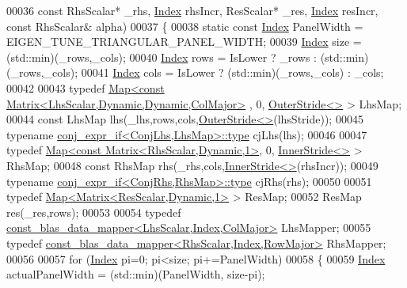 \begin{DoxyCode}
00036         \textcolor{keyword}{const} RhsScalar* \_rhs, \hyperlink{namespace_eigen_a62e77e0933482dafde8fe197d9a2cfde}{Index} rhsIncr, ResScalar* \_res, \hyperlink{namespace_eigen_a62e77e0933482dafde8fe197d9a2cfde}{Index} resIncr, \textcolor{keyword}{const} RhsScalar& 
      alpha)
00037   \{
00038     \textcolor{keyword}{static} \textcolor{keyword}{const} \hyperlink{namespace_eigen_a62e77e0933482dafde8fe197d9a2cfde}{Index} PanelWidth = EIGEN\_TUNE\_TRIANGULAR\_PANEL\_WIDTH;
00039     \hyperlink{namespace_eigen_a62e77e0933482dafde8fe197d9a2cfde}{Index} size = (std::min)(\_rows,\_cols);
00040     \hyperlink{namespace_eigen_a62e77e0933482dafde8fe197d9a2cfde}{Index} rows = IsLower ? \_rows : (std::min)(\_rows,\_cols);
00041     \hyperlink{namespace_eigen_a62e77e0933482dafde8fe197d9a2cfde}{Index} cols = IsLower ? (std::min)(\_rows,\_cols) : \_cols;
00042 
00043     \textcolor{keyword}{typedef} \hyperlink{group___core___module_class_eigen_1_1_map}{Map<const Matrix<LhsScalar,Dynamic,Dynamic,ColMajor>}
      , 0, \hyperlink{class_eigen_1_1_outer_stride}{OuterStride<>} > LhsMap;
00044     \textcolor{keyword}{const} LhsMap lhs(\_lhs,rows,cols,\hyperlink{class_eigen_1_1_outer_stride}{OuterStride<>}(lhsStride));
00045     \textcolor{keyword}{typename} \hyperlink{group___sparse_core___module}{conj\_expr\_if<ConjLhs,LhsMap>::type} cjLhs(lhs);
00046 
00047     \textcolor{keyword}{typedef} \hyperlink{group___core___module_class_eigen_1_1_map}{Map<const Matrix<RhsScalar,Dynamic,1>}, 0, 
      \hyperlink{class_eigen_1_1_inner_stride}{InnerStride<>} > RhsMap;
00048     \textcolor{keyword}{const} RhsMap rhs(\_rhs,cols,\hyperlink{class_eigen_1_1_inner_stride}{InnerStride<>}(rhsIncr));
00049     \textcolor{keyword}{typename} \hyperlink{group___sparse_core___module}{conj\_expr\_if<ConjRhs,RhsMap>::type} cjRhs(rhs);
00050 
00051     \textcolor{keyword}{typedef} \hyperlink{group___core___module_class_eigen_1_1_map}{Map<Matrix<ResScalar,Dynamic,1>} > ResMap;
00052     ResMap res(\_res,rows);
00053 
00054     \textcolor{keyword}{typedef} \hyperlink{class_eigen_1_1internal_1_1const__blas__data__mapper}{const\_blas\_data\_mapper<LhsScalar,Index,ColMajor>}
       LhsMapper;
00055     \textcolor{keyword}{typedef} \hyperlink{class_eigen_1_1internal_1_1const__blas__data__mapper}{const\_blas\_data\_mapper<RhsScalar,Index,RowMajor>}
       RhsMapper;
00056 
00057     \textcolor{keywordflow}{for} (\hyperlink{namespace_eigen_a62e77e0933482dafde8fe197d9a2cfde}{Index} pi=0; pi<size; pi+=PanelWidth)
00058     \{
00059       \hyperlink{namespace_eigen_a62e77e0933482dafde8fe197d9a2cfde}{Index} actualPanelWidth = (std::min)(PanelWidth, size-pi);

\end{DoxyCode}
